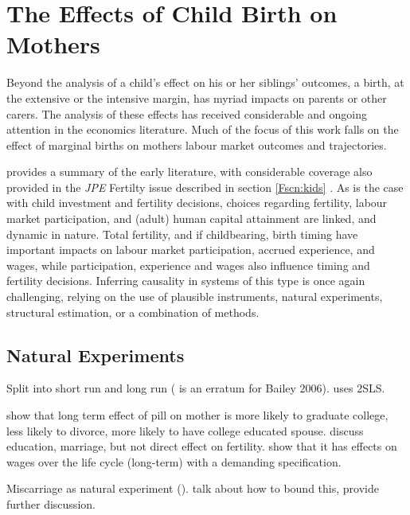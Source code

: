 \section{The Effects of Child Birth on Mothers}
\label{Fscn:mothers}
Beyond the analysis of a child's effect on his or her siblings' outcomes, a
birth, at the extensive or the intensive margin, has myriad impacts on parents
or other carers.  The analysis of these effects has received considerable and 
ongoing attention in the economics literature.  Much of the focus of this work
falls on the effect of marginal births on mothers labour market outcomes and
trajectories.

\citet{FleisherRhodes1979} provides a summary of the early literature, with 
considerable coverage also provided in the \emph{JPE} Fertilty issue described
in section \ref{Fscn:kids} \citep{Willis1973,Gronau1973}.  As is the case with
child investment and fertility decisions, choices regarding fertility, labour
market participation, and (adult) human capital attainment are linked, and 
dynamic in nature.  Total fertility, and if childbearing, birth timing have
important impacts on labour market participation, accrued experience, and
wages, while participation, experience and wages also influence timing and
fertility decisions.  Inferring causality in systems of this type is once again
challenging, relying on the use of plausible instruments, natural experiments,
structural estimation, or a combination of methods.

\subsection{Natural Experiments}
\label{Fsscn:motherNExp}
Split into short run and long run
\citet{Bailey2011,Bailey2006,Bailey2013,Bailey2012,Christensen2012,
Guldi2008,KearnerLevine2009,Levineetal1999,AngristEvans1996,
Jacobsenetal1999,AngristEvans1998,Cristia2008}
(\citet{Bailey2009} is an erratum for Bailey 2006). \citet{AngristEvans1996} 
uses 2SLS.

\citet{OltmansHungerman2012} show that long term effect of pill on mother is
more likely to graduate college, less likely to divorce, more likely to have
college educated spouse.  \citet{GoldinKatz2002a} discuss education, marriage,
but not direct effect on fertility. \citet{Baileyetal2012} show that it has
effects on wages over the life cycle (long-term) with a demanding specification.

Miscarriage as natural experiment (\citet{Hotzetal2005,Fletcher2012}).  
\citet{Hotzetal1997} talk about how to bound this, \citet{FletcherWolfe2009} 
provide further discussion.



